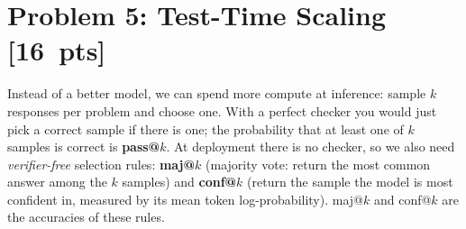\documentclass[11pt]{article}
\newcommand{\pts}[1]{\textnormal{[#1~pts]}}
\begin{document}
\section*{Problem 5: Test-Time Scaling \pts{16}}
Instead of a better model, we can spend more compute at inference: sample $k$ responses per problem and choose
one. With a perfect checker you would just pick a correct sample if there is one; the probability that at least
one of $k$ samples is correct is \textbf{pass@$k$}. At deployment there is no checker, so we also need
\emph{verifier-free} selection rules: \textbf{maj@$k$} (majority vote: return the most common answer among the
$k$ samples) and \textbf{conf@$k$} (return the sample the model is most confident in, measured by its mean
token log-probability). maj@$k$ and conf@$k$ are the accuracies of these rules.
\end{document}
